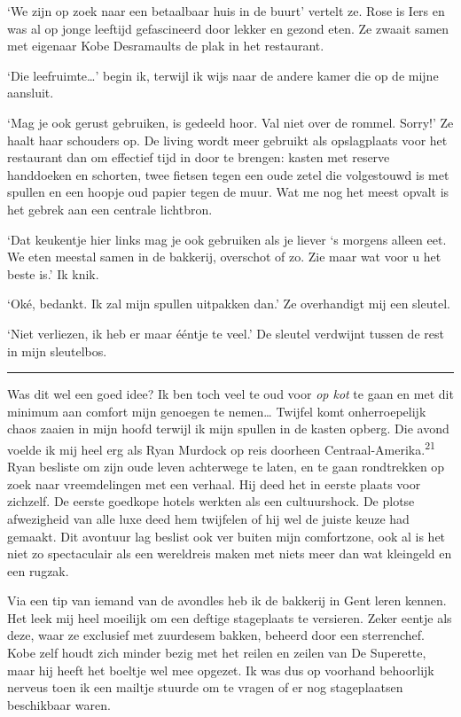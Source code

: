 \documentclass[
  11pt,
  dutch,
]{memoir}
\begin{document}
`We zijn op zoek naar een betaalbaar huis in de buurt' vertelt ze. Rose
is Iers en was al op jonge leeftijd gefascineerd door lekker en gezond
eten. Ze zwaait samen met eigenaar Kobe Desramaults de plak in het
restaurant.

`Die leefruimte\ldots{}' begin ik, terwijl ik wijs naar de andere kamer
die op de mijne aansluit.

`Mag je ook gerust gebruiken, is gedeeld hoor. Val niet over de rommel.
Sorry!' Ze haalt haar schouders op. De living wordt meer gebruikt als
opslagplaats voor het restaurant dan om effectief tijd in door te
brengen: kasten met reserve handdoeken en schorten, twee fietsen tegen
een oude zetel die volgestouwd is met spullen en een hoopje oud papier
tegen de muur. Wat me nog het meest opvalt is het gebrek aan een
centrale lichtbron.

`Dat keukentje hier links mag je ook gebruiken als je liever `s morgens
alleen eet. We eten meestal samen in de bakkerij, overschot of zo. Zie
maar wat voor u het beste is.' Ik knik.

`Oké, bedankt. Ik zal mijn spullen uitpakken dan.' Ze overhandigt mij
een sleutel.

`Niet verliezen, ik heb er maar ééntje te veel.' De sleutel verdwijnt
tussen de rest in mijn sleutelbos.

\pfbreak

Was dit wel een goed idee? Ik ben toch veel te oud voor \emph{op kot} te
gaan en met dit minimum aan comfort mijn genoegen te nemen\ldots{}
Twijfel komt onherroepelijk chaos zaaien in mijn hoofd terwijl ik mijn
spullen in de kasten opberg. Die avond voelde ik mij heel erg als Ryan
Murdock op reis doorheen Centraal-Amerika.\textsuperscript{21} Ryan
besliste om zijn oude leven achterwege te laten, en te gaan rondtrekken
op zoek naar vreemdelingen met een verhaal. Hij deed het in eerste
plaats voor zichzelf. De eerste goedkope hotels werkten als een
cultuurshock. De plotse afwezigheid van alle luxe deed hem twijfelen of
hij wel de juiste keuze had gemaakt. Dit avontuur lag beslist ook ver
buiten mijn comfortzone, ook al is het niet zo spectaculair als een
wereldreis maken met niets meer dan wat kleingeld en een rugzak.

Via een tip van iemand van de avondles heb ik de bakkerij in Gent leren
kennen. Het leek mij heel moeilijk om een deftige stageplaats te
versieren. Zeker eentje als deze, waar ze exclusief met zuurdesem
bakken, beheerd door een sterrenchef. Kobe zelf houdt zich minder bezig
met het reilen en zeilen van De Superette, maar hij heeft het boeltje
wel mee opgezet. Ik was dus op voorhand behoorlijk nerveus toen ik een
mailtje stuurde om te vragen of er nog stageplaatsen beschikbaar waren.
\end{document}
